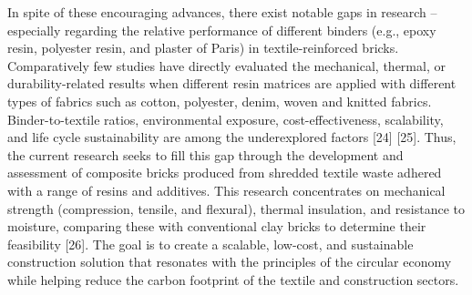 \noindent In spite of these encouraging advances, there exist notable gaps in research -- especially regarding the relative performance of different binders (e.g., epoxy resin, polyester resin, and plaster of Paris) in textile-reinforced bricks. Comparatively few studies have directly evaluated the mechanical, thermal, or durability-related results when different resin matrices are applied with different types of fabrics such as cotton, polyester, denim, woven and knitted fabrics. Binder-to-textile ratios, environmental exposure, cost-effectiveness, scalability, and life cycle sustainability are among the underexplored factors [24] [25]. Thus, the current research seeks to fill this gap through the development and assessment of composite bricks produced from shredded textile waste adhered with a range of resins and additives. This research concentrates on mechanical strength (compression, tensile, and flexural), thermal insulation, and resistance to moisture, comparing these with conventional clay bricks to determine their feasibility  [26]. The goal is to create a scalable, low-cost, and sustainable construction solution that resonates with the principles of the circular economy while helping reduce the carbon footprint of the textile and construction sectors.




